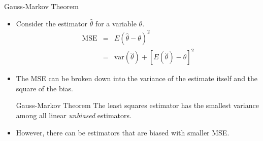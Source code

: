 \documentclass[aspectratio=169]{beamer}
\begin{document}
\begin{frame}{Gauss-Markov Theorem}
    \begin{itemize}
        \item Consider the estimator $\hat{\theta}$ for a variable $\theta$.
        \begin{eqnarray*}
            \mathrm{MSE} & = & E(\hat{\theta} - \theta)^2 \\
            & = & \mathrm{var}(\hat{\theta}) + [E(\hat{\theta}) - \theta]^2
        \end{eqnarray*}
        \item The MSE can be broken down into the variance of the estimate itself and the square of the bias.
        \begin{block}{Gauss-Markov Theorem}
        The least squares estimator has the smallest variance among all linear \textit{unbiased} estimators.
        \end{block}
        \item However, there can be estimators that are biased with smaller MSE.
    \end{itemize}
\end{frame}
\end{document}
